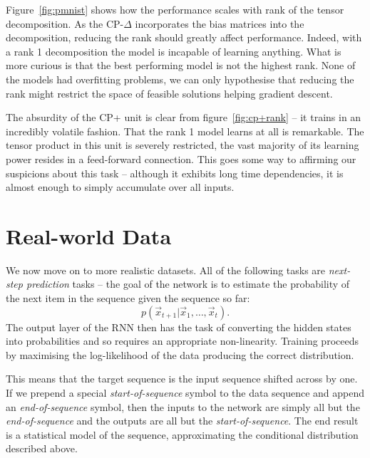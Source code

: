 Figure~\ref{fig:pmnist} shows how the performance scales with rank of
the tensor decomposition. As the CP-\(\Delta\) incorporates the
bias matrices into the decomposition, reducing the rank should greatly
affect performance. Indeed, with a rank 1 decomposition the model is
incapable of learning anything. What is more curious is that the
best performing model is not the highest rank. None of the models
had overfitting problems, we can only hypothesise that reducing the rank
might restrict the space of feasible solutions helping gradient descent.

The absurdity of the CP+ unit is clear from figure~\ref{fig:cp+rank} --
it trains in an incredibly volatile fashion. That the rank 1 model learns
at all is remarkable. The tensor product in this unit is severely
restricted, the vast majority of its learning power resides in a
feed-forward connection. This goes some way to affirming our suspicions
about this task -- although it exhibits long time dependencies, it
is almost enough to simply accumulate over all inputs.

\section{Real-world Data}
We now move on to more realistic datasets. All of the following tasks are
\emph{next-step prediction} tasks -- the goal of the network is to estimate
the probability of the next item in the sequence given the sequence so far:
\begin{equation} \label{eq:seqprob}
	p(\vec{x}_{t+1} | \vec{x}_{1},\ldots,\vec{x}_{t}).
\end{equation} The output layer of the RNN then has the task of converting
the hidden states into probabilities and so requires an appropriate non-linearity.
Training proceeds by maximising the log-likelihood of the data producing the
correct distribution.

This means that the target sequence is the input
sequence shifted across by one. If we prepend a special \emph{start-of-sequence}
symbol to the data sequence and append an \emph{end-of-sequence} symbol,
then the inputs to the network are simply all but the \emph{end-of-sequence}
and the outputs are all but the \emph{start-of-sequence}.
The end result is a statistical model of the sequence, approximating the
conditional distribution described above.

